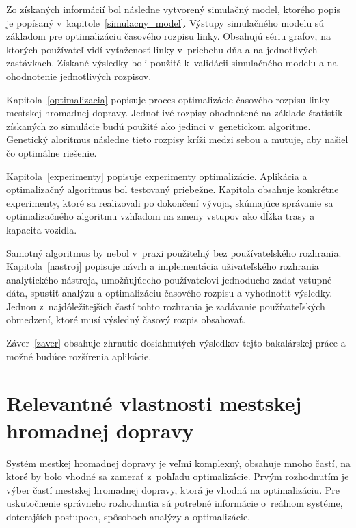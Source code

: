 Zo získaných informácií bol následne vytvorený simulačný model, ktorého popis je popísaný v~kapitole~\ref{simulacny_model}.
Výstupy simulačného modelu sú základom pre optimalizáciu časového rozpisu linky.
Obsahujú sériu grafov, na ktorých používateľ vidí vyťaženosť linky v~priebehu dňa a na jednotlivých zastávkach.
Získané výsledky boli použité k~validácii simulačného modelu a na ohodnotenie jednotlivých rozpisov.

Kapitola~\ref{optimalizacia} popisuje proces optimalizácie časového rozpisu linky mestskej hromadnej dopravy.
Jednotlivé rozpisy ohodnotené na základe štatistík získaných zo simulácie budú použité ako jedinci v~genetickom algoritme.
Genetický aloritmus následne tieto rozpisy kríži medzi sebou a mutuje, aby našiel čo optimálne riešenie.

Kapitola~\ref{experimenty} popisuje experimenty optimalizácie.
Aplikácia a optimalizačný algoritmus bol testovaný priebežne.
Kapitola obsahuje konkrétne experimenty, ktoré sa realizovali po dokončení vývoja,
skúmajúce správanie sa optimalizačného algoritmu vzhľadom na zmeny vstupov ako dĺžka trasy a kapacita vozidla.

Samotný algoritmus by nebol v~praxi použiteľný bez používateľského rozhrania.
Kapitola~\ref{nastroj} popisuje návrh a implementácia uživateľského rozhrania analytického nástroja, umožňujúceho používateľovi jednoducho zadať vstupné dáta, spustiť analýzu a optimalizáciu časového rozpisu a vyhodnotiť výsledky.
Jednou z~najdôležitejších častí tohto rozhrania je zadávanie používateľských obmedzení, ktoré musí výsledný časový rozpis obsahovať.

Záver~\ref{zaver} obsahuje zhrnutie dosiahnutých výsledkov tejto bakalárskej práce a možné budúce rozšírenia aplikácie.

\chapter{Relevantné vlastnosti mestskej hromadnej dopravy}\label{relevantne_vlastnosti}

Systém mestkej hromadnej dopravy je veľmi komplexný, obsahuje mnoho častí, na ktoré by bolo vhodné sa zamerať z~pohľadu optimalizácie.
Prvým rozhodnutím je výber častí mestskej hromadnej dopravy, ktorá je vhodná na optimalizáciu.
Pre uskutočnenie správneho rozhodnutia sú potrebné informácie o~reálnom systéme, doterajších postupoch, spôsoboch analýzy a optimalizácie.

